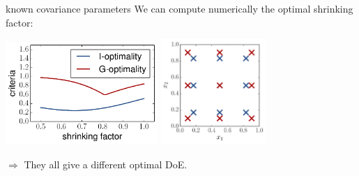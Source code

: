 \begin{frame}{known covariance parameters}
We can compute numerically the optimal shrinking factor:
\vspace{2mm}
\begin{center}
\includegraphics[height=3.9cm]{2_Design_of_experiments/figures/python/opt_IG} \qquad
\includegraphics[height=4cm]{2_Design_of_experiments/figures/python/opt_XIG}
\end{center}
\vspace{2mm}
$\Rightarrow$ They all give a different optimal DoE.
\end{frame}


